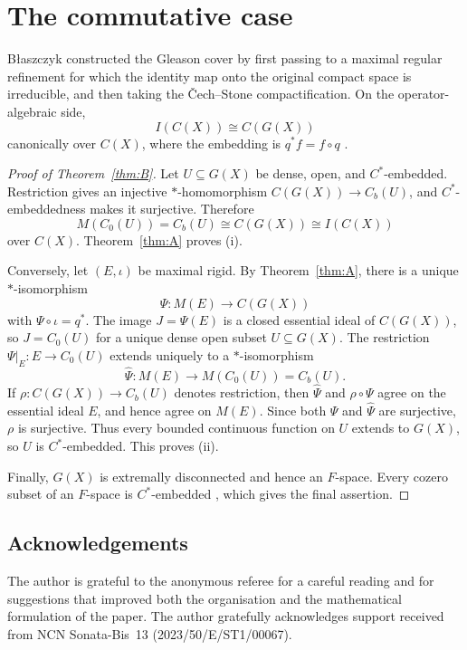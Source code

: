 \documentclass[11pt,a4paper]{amsart}
\numberwithin{equation}{section}
\theoremstyle{paperplain}
\theoremstyle{remark}
\begin{document}
\section{The commutative case}

B{\l}aszczyk \cite{Blaszczyk} constructed the Gleason cover by first passing to a maximal regular refinement for which the identity map onto the original compact space is irreducible, and then taking the \v{C}ech--Stone compactification. On the operator-algebraic side,
\[
I(C(X))\cong C(G(X))
\]
canonically over $C(X)$, where the embedding is $q^*f=f\circ q$ \cite{Hamana1979Cstar}.

\begin{proof}[Proof of Theorem~\ref{thm:B}]
Let $U\subseteq G(X)$ be dense, open, and $C^*$-embedded. Restriction gives an injective $*$-homomorphism $C(G(X))\to C_b(U)$, and $C^*$-embeddedness makes it surjective. Therefore
\[
M(C_0(U))=C_b(U)\cong C(G(X))\cong I(C(X))
\]
over $C(X)$. Theorem~\ref{thm:A} proves (i).

Conversely, let $(E,\iota)$ be maximal rigid. By Theorem~\ref{thm:A}, there is a unique $*$-isomorphism
\[
\Psi\colon M(E)\longrightarrow C(G(X))
\]
with $\Psi\circ\iota=q^*$. The image $J=\Psi(E)$ is a closed essential ideal of $C(G(X))$, so $J=C_0(U)$ for a unique dense open subset $U\subseteq G(X)$. The restriction $\Psi|_E\colon E\to C_0(U)$ extends uniquely to a $*$-isomorphism
\[
\widehat\Psi\colon M(E)\longrightarrow M(C_0(U))=C_b(U).
\]
If $\rho\colon C(G(X))\to C_b(U)$ denotes restriction, then $\widehat\Psi$ and $\rho\circ\Psi$ agree on the essential ideal $E$, and hence agree on $M(E)$. Since both $\Psi$ and $\widehat\Psi$ are surjective, $\rho$ is surjective. Thus every bounded continuous function on $U$ extends to $G(X)$, so $U$ is $C^*$-embedded. This proves (ii).

Finally, $G(X)$ is extremally disconnected and hence an $F$-space. Every cozero subset of an $F$-space is $C^*$-embedded \cite[Theorem~14.25]{GillmanJerison}, which gives the final assertion.
\end{proof}

\subsection*{Acknowledgements}
The author is grateful to the anonymous referee for a careful reading and for suggestions that improved both the organisation and the mathematical formulation of the paper. The author gratefully acknowledges support received from NCN Sonata-Bis~13 (2023/50/E/ST1/00067).
\end{document}
